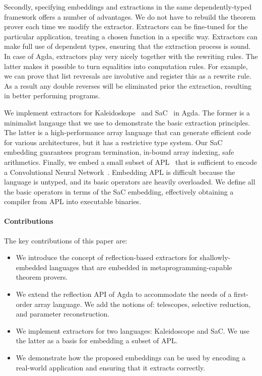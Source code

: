\documentclass[acmsmall,review,anonymous]{acmart}\settopmatter{printfolios=true,printccs=false,printacmref=false}
\begin{document}
Secondly, specifying embeddings and extractions in the same dependently-typed
framework offers a number of advantages.  We do not have to rebuild the
theorem prover each time we modify the extractor.  Extractors can be
fine-tuned for the particular application, \eg{} treating a chosen function
in a specific way.  Extractors can make full use of dependent types,
ensuring that the extraction process is sound.  In case of Agda,
extractors play very nicely together with the rewriting rules.  The latter
makes it possible to turn equalities into computation rules.  For example,
we can prove that list revresals are involutive and register this as a
rewrite rule.  As a result any double reverses will be eliminated prior
the extraction, resulting in better performing programs.


We implement extractors for Kaleidoskope~\cite{kaleidoscope}
and SaC~\cite{sac} in Agda.
The former is a minimalist langauge that we use to demonstrate the basic
extraction principles.  The latter is a high-performance
array language that can generate efficient code for various architectures, but
it has a restrictive type system.  Our SaC embedding guarantees
program termination, in-bound array indexing, safe arithmetics.
Finally, we embed a small subset of APL~\cite{} that is
sufficient to encode a Convolutional Neural Network~\cite{cnninapl}.
Embedding APL is difficult because the language is untyped, and its
basic operators are heavily overloaded.  We define all the basic
operators in terms of the SaC embedding, effectively obtaining a
compiler from APL into executable binaries.

\paragraph{Contributions}
The key contributions of this paper are:
\begin{itemize}
    \item We introduce the concept of reflection-based extractors
            for shallowly-embedded languages that are embedded
            in metaprogramming-capable theorem provers.
    \item We extend the reflection API of Agda to accommodate
      the needs of a first-order array language.  We add
            the notions of: telescopes, selective reduction,
            and parameter reconstruction.
    \item We implement extractors for two languages: Kaleidoscope
            and SaC.  We use the latter as a basis for embedding
            a subset of APL.
    \item We demonstrate how the proposed embeddings can be used
            by encoding a real-world application and ensuring that
            it extracts correctly.
\end{itemize}
\end{document}
